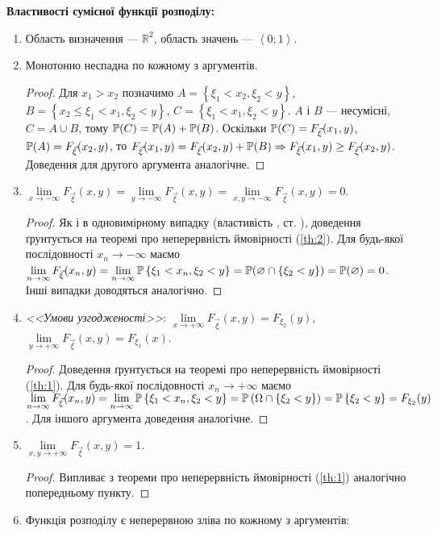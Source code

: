 \noindent\textbf{Властивості сумісної функції розподілу:}
\begin{enumerate}
    \item Область визначення --- $\mathbb{R}^2$, область значень --- $\left<0; 1\right>$.
    \item Монотонно неспадна по кожному з аргументів.
    \begin{proof}
        Для $x_1 > x_2$ позначимо
        $A = \left\{\xi_1 < x_2, \xi_2 < y \right\}$, 
        $B = \left\{x_2 \leq \xi_1 < x_1,\xi_2<y\right\}$, 
        $C = \left\{\xi_1 < x_1, \xi_2 < y\right\}$.
        $A$ і $B$ --- несумісні,
        $C = A \cup B$, тому $\P(C) = \P(A) + \P(B)$.
        Оскільки 
        $\P(C) = F_{\vec{\xi}}(x_1, y)$,  
        $\P(A) = F_{\vec{\xi}}(x_2, y)$, то 
        $F_{\vec{\xi}}(x_1, y) = F_{\vec{\xi}}(x_2, y) + \P(B)
        \Rightarrow F_{\vec{\xi}}(x_1, y) \geq  F_{\vec{\xi}}(x_2, y)$. 
        Доведення для другого аргумента аналогічне.
    \end{proof}
    \item $\lim\limits_{x \to -\infty} F_{\vec{\xi}}(x, y) = 
           \lim\limits_{y \to -\infty} F_{\vec{\xi}}(x, y) = 
           \lim\limits_{x,y \to -\infty} F_{\vec{\xi}}(x, y) = 0$.
    \begin{proof}
        Як і в одновимірному випадку (властивість , ст. \pageref{cdf:limit}),
        доведення ґрунтується на теоремі про неперервність 
        ймовірності (\ref{th:2}).
        Для будь-якої послідовності $x_n \to -\infty$ маємо
        $\lim\limits_{n \to \infty} F_{\vec{\xi}}(x_n, y) = 
        \lim\limits_{n \to \infty} \P\left\{\xi_1<x_n,\xi_2<y\right\} 
        = \P(\varnothing \cap \{\xi_2 < y\})
        = \P(\varnothing) = 0$.
        Інші випадки доводяться аналогічно.
    \end{proof}
    \item \emph{<<Умови узгодженості>>}:
    $\lim\limits_{x \to +\infty} F_{\vec{\xi}}(x, y) = F_{\xi_2}(y)$, 
    $\lim\limits_{y \to +\infty} F_{\vec{\xi}}(x, y) = F_{\xi_1}(x)$.
    \begin{proof}
        Доведення ґрунтується на теоремі про неперервність 
        ймовірності (\ref{th:1}). Для будь-якої
        послідовності $x_n \to +\infty$ маємо
        $\lim\limits_{n \to \infty} F_{\vec{\xi}}(x_n, y) = 
        \lim\limits_{n \to \infty} 
        \P\left\{\xi_1 < x_n, \xi_2 < y\right\} = 
        \P\left(\Omega \cap \left\{\xi_2<y\right\}\right) = 
        \P\left\{\xi_2<y\right\} = F_{\xi_2}(y)$. 
        Для іншого аргумента доведення аналогічне.
    \end{proof}
    \item $\lim\limits_{x,y \to +\infty} F_{\vec{\xi}}(x, y) = 1$.
    \begin{proof}
        Випливає з теореми про неперервність 
        ймовірності (\ref{th:1}) аналогічно попередньому пункту.
    \end{proof}
    \item Функція розподілу є неперервною зліва по кожному з аргументів: 
    

\end{enumerate}
